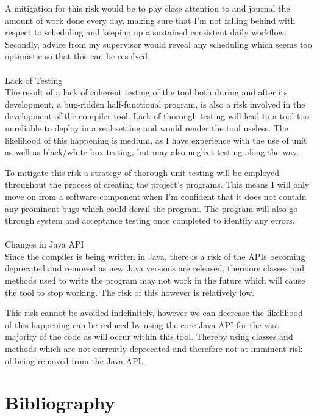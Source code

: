 \documentclass[a4paper, 11pt]{article}
\begin{document}
A mitigation for this risk would be to pay close attention to and journal the amount of work done every day, making sure that I'm not falling behind with respect to scheduling and keeping up a sustained consistent daily workflow. Secondly, advice from my supervisor would reveal any scheduling which seems too optimistic so that this can be resolved.
\\
\\
\textbullet\space Lack of Testing \\
The result of a lack of coherent testing of the tool both during and after its development, a bug-ridden half-functional program, is also a risk involved in the development of the compiler tool. Lack of thorough testing will lead to a tool too unreliable to deploy in a real setting and would render the tool useless. The likelihood of this happening is medium, as I have experience with the use of unit as well as black/white box testing, but may also neglect testing along the way.

To mitigate this risk a strategy of thorough unit testing will be employed throughout the process of creating the project's programs. This means I will only move on from a software component when I'm confident that it does not contain any prominent bugs which could derail the program. The program will also go through system and acceptance testing once completed to identify any errors.
\\
\\
\textbullet\space Changes in Java API \\
Since the compiler is being written in Java, there is a risk of the APIs becoming deprecated and removed as new Java versions are released, therefore classes and methods used to write the program may not work in the future which will cause the tool to stop working. The risk of this however is relatively low.

This risk cannot be avoided indefinitely, however we can decrease the likelihood of this happening can be reduced by using the core Java API for the vast majority of the code as will occur within this tool. Thereby using classes and methods which are not currently deprecated and therefore not at imminent risk of being removed from the Java API.

\newpage

\section{Bibliography}
\end{document}
